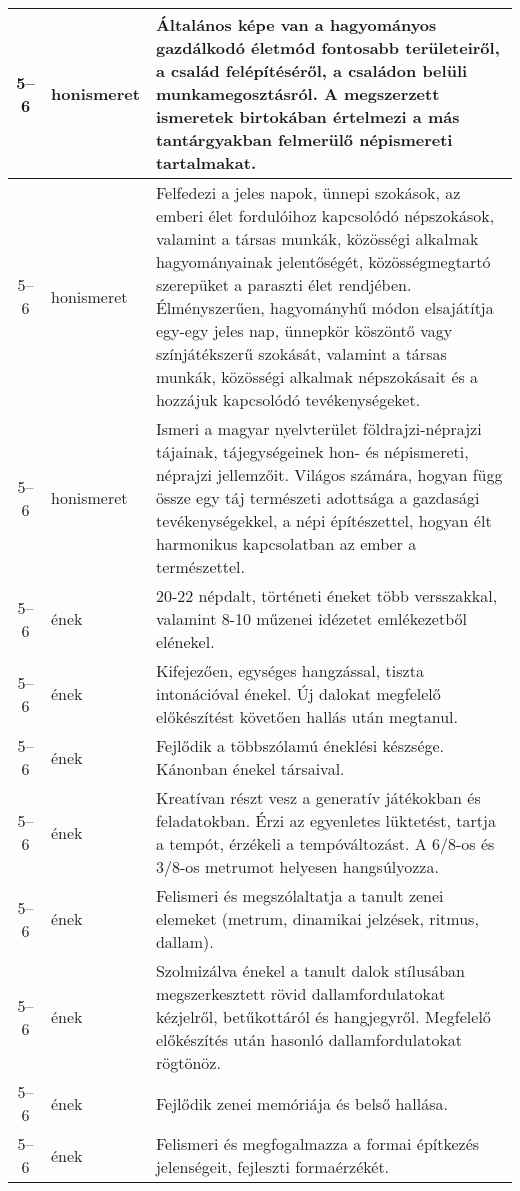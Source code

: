 \begin{small}
\begin{longtable}{c | p{2cm} |  p{11cm} }
              5--6 & honismeret & Általános képe van a hagyományos gazdálkodó életmód fontosabb területeiről, a család felépítéséről, a családon belüli munkamegosztásról. A megszerzett ismeretek birtokában értelmezi a más tantárgyakban felmerülő népismereti tartalmakat. \\ \hline
              5--6 & honismeret & Felfedezi a jeles napok, ünnepi szokások, az emberi élet fordulóihoz kapcsolódó népszokások, valamint a társas munkák, közösségi alkalmak hagyományainak jelentőségét, közösségmegtartó szerepüket a paraszti élet rendjében. Élményszerűen, hagyományhű módon elsajátítja egy-egy jeles nap, ünnepkör köszöntő vagy színjátékszerű szokását, valamint a társas munkák, közösségi alkalmak népszokásait és a hozzájuk kapcsolódó tevékenységeket. \\ \hline
              5--6 & honismeret & Ismeri a magyar nyelvterület földrajzi-néprajzi tájainak, tájegységeinek hon- és népismereti, néprajzi jellemzőit. Világos számára, hogyan függ össze egy táj természeti adottsága a gazdasági tevékenységekkel, a népi építészettel, hogyan élt harmonikus kapcsolatban az ember a természettel. \\ \hline
              5--6 & ének & 20-22 népdalt, történeti éneket több versszakkal, valamint 8-10 műzenei idézetet emlékezetből elénekel. \\ \hline
              5--6 & ének & Kifejezően, egységes hangzással, tiszta intonációval énekel. Új dalokat megfelelő előkészítést követően hallás után megtanul. \\ \hline
              5--6 & ének & Fejlődik a többszólamú éneklési készsége. Kánonban énekel társai\-val. \\ \hline
              5--6 & ének & Kreatívan részt vesz a generatív játékokban és feladatokban. Érzi az egyenletes lüktetést, tartja a tempót, érzékeli a tempóváltozást. A 6/8-os és 3/8-os metrumot helyesen hangsúlyozza. \\ \hline
              5--6 & ének & Felismeri és megszólaltatja a tanult zenei elemeket (metrum, dinamikai jelzések, ritmus, dallam). \\ \hline
              5--6 & ének & Szolmizálva énekel a tanult dalok stílusában megszerkesztett rövid dallamfordulatokat kézjelről, betűkottáról és hangjegyről. Megfelelő előkészítés után hasonló dallamfordulatokat rögtönöz. \\ \hline
              5--6 & ének & Fejlődik zenei memóriája és belső hallása. \\ \hline
              5--6 & ének & Felismeri és megfogalmazza a formai építkezés jelenségeit, fejleszti formaérzékét. \\ \hline

\end{longtable}
\end{small}
